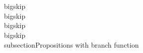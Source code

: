 \\[, \\Bb{if(i \\Pe j)}{,\\Tc c_1,}{,\\Tc c_2,}, \\Rq , \\Bb{if(i \\Pe j)}{,\\Tc c_1,}{,i \\nPe j,\\Tc c_2,},\\]

\\bigskip
\\bigskip
\\bigskip
\\bigskip
\\subsection{Propositions with branch function}
\\[,i \\Pe j, \\Bb{if(i \\Pe j)}{,\\Tc c_1,}{,\\Tc c_2,}, \\Rq , i \\Pe j, \\Tc c_1,\\]

